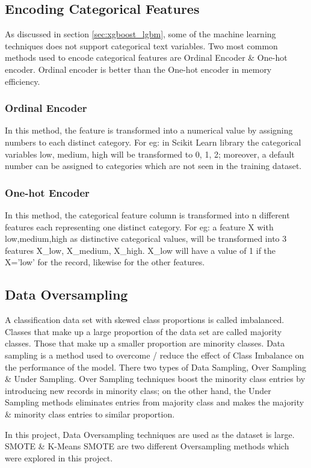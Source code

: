 \documentclass[twoside,11pt,a4paper]{article}
\begin{document}
\subsection{Encoding Categorical Features}
As discussed in section \ref{sec:xgboost_lgbm}, some of the machine learning techniques does not support categorical text variables. Two most common methods used to encode categorical features are Ordinal Encoder \& One-hot encoder. Ordinal encoder is better than the One-hot encoder in memory efficiency.
\subsubsection{Ordinal Encoder}
In this method, the feature is transformed into a numerical value by assigning numbers to each distinct category. For eg: in Scikit Learn library the categorical variables low, medium, high will be transformed to 0, 1, 2; moreover, a default number can be assigned to categories which are not seen in the training dataset. 
\subsubsection{One-hot Encoder}
In this method, the categorical feature column is transformed into n different features each representing one distinct category. For eg: a feature X with low,medium,high as distinctive categorical values, will be transformed into 3 features X\_low, X\_medium, X\_high. X\_low will have a value of 1 if the X='low' for the record, likewise for the other features.
\subsection{Data Oversampling}
A classification data set with skewed class proportions is called imbalanced. Classes that make up a large proportion of the data set are called majority classes. Those that make up a smaller proportion are minority classes. Data sampling is a method used to overcome / reduce the effect of Class Imbalance on the performance of the model. There two types of Data Sampling, Over Sampling \& Under Sampling. Over Sampling techniques boost the minority class entries by introducing new records in minority class; on the other hand, the Under Sampling methods eliminates entries from majority class and makes the majority \& minority class entries to similar proportion.

In this project, Data Oversampling techniques are used as the dataset is large. \acf{SMOTE} \citep{chawla2002smote} \&  K-Means \acs{SMOTE} \citep{last2017oversampling} are two different Oversampling methods which were explored in this project.
\end{document}
